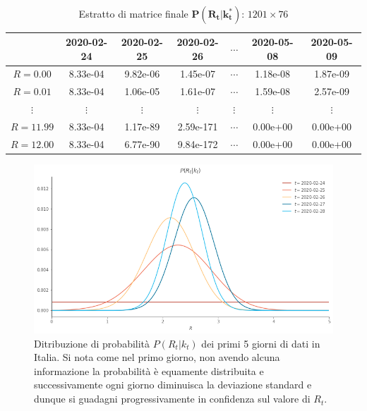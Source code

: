 \documentclass[11pt]{article}
\begin{document}
    
\begin{table}
  \begin{center}
    \caption{Estratto di matrice finale $\mathbf{P(R_t|k_t^*)}$: $1201 \times 76$}
    \label{tab:prkfull}
    \begin{tabular}{c|c|c|c|c|c|c|}
          & 2020-02-24 & 
          2020-02-25 &
          2020-02-26 &
          $\cdots$ & 
          2020-05-08 & 
          2020-05-09 \\
        \toprule
        $R=0.00$ & 8.33e-04 & 9.82e-06 & 1.45e-07 & $\cdots$ & 1.18e-08 & 1.87e-09 \\
        \midrule
        $R=0.01$ & 8.33e-04 & 1.06e-05 & 1.61e-07 & $\cdots$ & 1.59e-08 & 2.57e-09 \\
        \midrule
        $\vdots$ & $\vdots$ & $\vdots$ & $\vdots$ & $\vdots$ & $\vdots$ & $\vdots$ \\
        \midrule
        $R=11.99$ & 8.33e-04 & 1.17e-89 & 2.59e-171 & $\cdots$ & 0.00e+00 & 0.00e+00 \\
        \midrule
        $R=12.00$ & 8.33e-04 & 6.77e-90 & 9.84e-172 & $\cdots$ & 0.00e+00 & 0.00e+00 \\
        \bottomrule
    \end{tabular}
  \end{center}
\end{table}
        

    
    
    \begin{figure}
    \centering
        \includegraphics{prk.png}
        \caption{Ditribuzione di probabilità $P(R_t|k_t)$ dei primi 5 giorni di dati in Italia. Si nota come nel primo giorno, non avendo alcuna informazione la probabilità è equamente distribuita e successivamente ogni giorno diminuisca la deviazione standard e dunque si guadagni progressivamente in confidenza sul valore di $R_t$.}
        \label{fig:prk}
    \end{figure}
\end{document}
